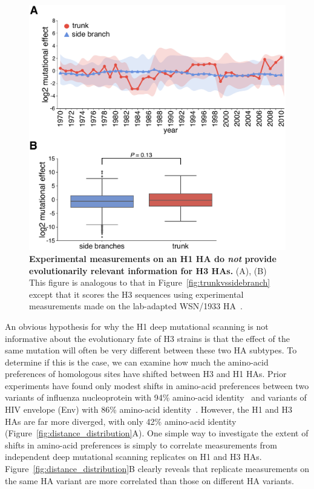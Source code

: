 \documentclass[9pt,twocolumn,twoside]{pnas-new}
\begin{document}
\begin{figure}
\centering
\includegraphics[width=\columnwidth]{figs/WSN_trunkvssidebranch/WSN_trunkvssidebranch.pdf}
\caption{\label{fig:WSN_trunkvssidebranch}
{\bf Experimental measurements on an H1 HA do \emph{not} provide evolutionarily relevant information for H3 HAs.}
(A), (B) This figure is analogous to that in Figure~\ref{fig:trunkvssidebranch} except that it scores the H3 sequences using experimental measurements made on the lab-adapted WSN/1933 HA~\cite{doud2016accurate}.
}
\end{figure}

An obvious hypothesis for why the H1 deep mutational scanning is not informative about the evolutionary fate of H3 strains is that the effect of the same mutation will often be very different between these two HA subtypes.
To determine if this is the case, we can examine how much the amino-acid preferences of homologous sites have shifted between H3 and H1 HAs.
Prior experiments have found only modest shifts in amino-acid preferences between two variants of influenza nucleoprotein with 94\% amino-acid identity~\cite{doud2015site} and variants of HIV envelope (Env) with 86\% amino-acid identity~\cite{haddox2017mapping}.
However, the H1 and H3 HAs are far more diverged, with only 42\% amino-acid identity (Figure~\ref{fig:distance_distribution}A).
One simple way to investigate the extent of shifts in amino-acid preferences is simply to correlate measurements from independent deep mutational scanning replicates on H1 and H3 HAs.
Figure~\ref{fig:distance_distribution}B clearly reveals that replicate measurements on the same HA variant are more correlated than those on different HA variants.
\end{document}
